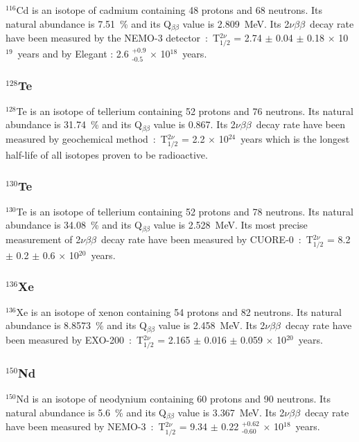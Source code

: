 \documentclass[main.tex]{subfiles}
\begin{document}
\NI $^\text{116}$Cd is an isotope of cadmium containing 48 protons and 68 neutrons. Its natural abundance is 7.51~\% and its Q$_{\beta\beta}$ value is 2.809~MeV. Its 2$\nu\beta\beta$~decay rate have been measured by the NEMO-3 detector~:~T$_{\text{1/2}}^{\text{2}\nu}$ = 2.74 $\pm$ 0.04 $\pm$ 0.18 $\times$ 10$^{\text{19}}$~years and by Elegant : 2.6 $^{\text{+0.9}}_{\text{-0.5}}$ $\times$ 10$^{\text{18}}$~years.


\subsubsection{$^{\text{128}}$Te}


\NI $^\text{128}$Te is an isotope of tellerium containing 52 protons and 76 neutrons. Its natural abundance is 31.74~\% and its Q$_{\beta\beta}$ value is 0.867. Its 2$\nu\beta\beta$~decay rate have been measured by geochemical method~:~T$_{\text{1/2}}^{\text{2}\nu}$ = 2.2 $\times$ 10$^{\text{24}}$~years which is the longest half-life of all isotopes proven to be radioactive.


\subsubsection{$^{\text{130}}$Te}


\NI $^\text{130}$Te is an isotope of tellerium containing 52 protons and 78 neutrons. Its natural abundance is 34.08~\% and its Q$_{\beta\beta}$ value is 2.528~MeV. Its most precise measurement of 2$\nu\beta\beta$~decay rate have been measured by CUORE-0~:~T$_{\text{1/2}}^{\text{2}\nu}$ = 8.2 $\pm$ 0.2 $\pm$ 0.6 $\times$ 10$^{\text{20}}$~years.


\subsubsection{$^{\text{136}}$Xe}


\NI $^\text{136}$Xe is an isotope of xenon containing 54 protons and 82 neutrons. Its natural abundance is 8.8573~\% and its Q$_{\beta\beta}$ value is 2.458~MeV. Its 2$\nu\beta\beta$~decay rate have been measured by EXO-200~:~T$_{\text{1/2}}^{\text{2}\nu}$ = 2.165 $\pm$ 0.016 $\pm$ 0.059 $\times$ 10$^{\text{20}}$~years.


\subsubsection{$^{\text{150}}$Nd}


\NI $^\text{150}$Nd is an isotope of neodynium containing 60 protons and 90 neutrons. Its natural abundance is 5.6~\% and its Q$_{\beta\beta}$ value is 3.367~MeV. Its 2$\nu\beta\beta$~decay rate have been measured by NEMO-3~:~T$_{\text{1/2}}^{\text{2}\nu}$ = 9.34 $\pm$ 0.22 $^{\text{+0.62}}_{\text{-0.60}}$ $\times$ 10$^{\text{18}}$~years.
\end{document}
